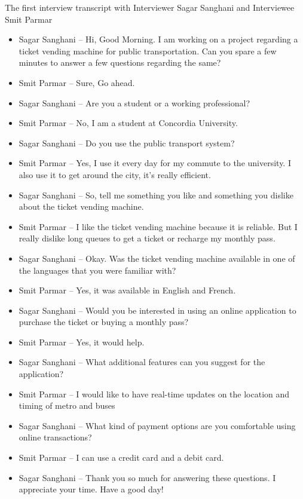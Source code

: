 The first interview transcript with Interviewer Sagar Sanghani and Interviewee Smit Parmar

\begin{itemize}
    \item[] Sagar Sanghani – Hi, Good Morning. I am working on a project regarding a ticket vending machine for public transportation. Can you spare a few minutes to answer a few questions regarding the same?
    \item[] Smit Parmar – Sure, Go ahead.
    \item[] Sagar Sanghani – Are you a student or a working professional?
    \item[] Smit Parmar – No, I am a student at Concordia University. 
    \item[] Sagar Sanghani – Do you use the public transport system?
    \item[] Smit Parmar – Yes, I use it every day for my commute to the university. I also use it to get around the city, it’s really efficient.
    \item[] Sagar Sanghani – So, tell me something you like and something you dislike about the ticket vending machine.
    \item[] Smit Parmar – I like the ticket vending machine because it is reliable. But I really dislike long queues to get a ticket or recharge my monthly pass.
    \item[] Sagar Sanghani – Okay. Was the ticket vending machine available in one of the languages that you were familiar with?
    \item[] Smit Parmar – Yes, it was available in English and French.
    \item[] Sagar Sanghani – Would you be interested in using an online application to purchase the ticket or buying a monthly pass?
    \item[] Smit Parmar – Yes, it would help.
    \item[] Sagar Sanghani – What additional features can you suggest for the application?
    \item[] Smit Parmar – I would like to have real-time updates on the location and timing of metro and buses
    \item[] Sagar Sanghani – What kind of payment options are you comfortable using online transactions?
    \item[] Smit Parmar – I can use a credit card and a debit card.
    \item[] Sagar Sanghani – Thank you so much for answering these questions. I appreciate your time. Have a good day!
\end{itemize}
\pagebreak

